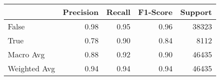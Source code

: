 \begin{tabular}{lrrrr}
\toprule
             &  Precision &  Recall &  F1-Score &  Support \\
\midrule
       False &       0.98 &    0.95 &      0.96 &    38323 \\
        True &       0.78 &    0.90 &      0.84 &     8112 \\
   Macro Avg &       0.88 &    0.92 &      0.90 &    46435 \\
Weighted Avg &       0.94 &    0.94 &      0.94 &    46435 \\
\bottomrule
\end{tabular}
